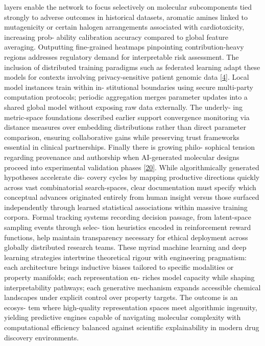 \documentclass[
]{article}
\begin{document}
layers enable the network to focus selectively on molecular
subcomponents tied strongly to adverse outcomes in historical datasets,
aromatic amines linked to mutagenicity or certain halogen arrangements
associated with cardiotoxicity, increasing prob- ability calibration
accuracy compared to global feature averaging. Outputting fine-grained
heatmaps pinpointing contribution-heavy regions addresses regulatory
demand for interpretable risk assessment. The inclusion of distributed
training paradigms such as federated learning adapt these models for
contexts involving privacy-sensitive patient genomic data
{[}\protect\hyperlink{_bookmark44}{4}{]}. Local model instances train
within in- stitutional boundaries using secure multi-party computation
protocols; periodic aggregation merges parameter updates into a shared
global model without exposing raw data externally. The underly- ing
metric-space foundations described earlier support convergence
monitoring via distance measures over embedding distributions rather
than direct parameter comparison, ensuring collaborative gains while
preserving trust frameworks essential in clinical partnerships. Finally
there is growing philo- sophical tension regarding provenance and
authorship when AI-generated molecular designs proceed into experimental
validation phases {[}\protect\hyperlink{_bookmark60}{20}{]}. While
algorithmically generated hypotheses accelerate dis- covery cycles by
mapping productive directions quickly across vast combinatorial
search-spaces, clear documentation must specify which conceptual
advances originated entirely from human insight versus those surfaced
independently through learned statistical associations within massive
training corpora. Formal tracking systems recording decision passage,
from latent-space sampling events through selec- tion heuristics encoded
in reinforcement reward functions, help maintain transparency necessary
for ethical deployment across globally distributed research teams. These
myriad machine learning and deep learning strategies intertwine
theoretical rigour with engineering pragmatism: each architecture brings
inductive biases tailored to specific modalities or property manifolds;
each representation en- riches model capacity while shaping
interpretability pathways; each generative mechanism expands accessible
chemical landscapes under explicit control over property targets. The
outcome is an ecosys- tem where high-quality representation spaces meet
algorithmic ingenuity, yielding predictive engines capable of navigating
molecular complexity with computational efficiency balanced against
scientific explainability in modern drug discovery environments.
\end{document}

